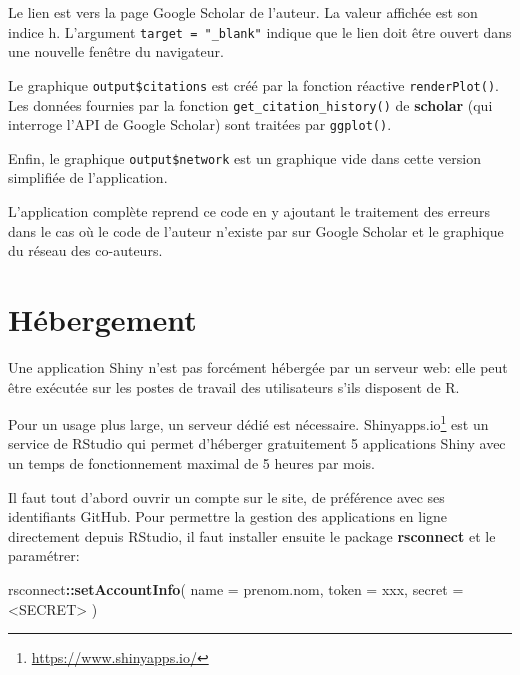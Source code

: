 \documentclass[
  12pt,
  french,
  a4paper,
  extrafontsizes,onecolumn,openright
  ]{memoir}
\newenvironment{Shaded}{\begin{snugshade}}{\end{snugshade}}
\newcommand{\AttributeTok}[1]{\textcolor[rgb]{0.13,0.29,0.53}{#1}}
\newcommand{\FunctionTok}[1]{\textcolor[rgb]{0.13,0.29,0.53}{\textbf{#1}}}
\newcommand{\NormalTok}[1]{#1}
\newcommand{\SpecialCharTok}[1]{\textcolor[rgb]{0.81,0.36,0.00}{\textbf{#1}}}
\newcommand{\StringTok}[1]{\textcolor[rgb]{0.31,0.60,0.02}{#1}}
\begin{document}
\normalsize

Le lien est vers la page Google Scholar de l'auteur.
La valeur affichée est son indice h.
L'argument \texttt{target\ =\ "\_blank"} indique que le lien doit être ouvert dans une nouvelle fenêtre du navigateur.

Le graphique \texttt{output\$citations} est créé par la fonction réactive \texttt{renderPlot()}.
Les données fournies par la fonction \texttt{get\_citation\_history()} de \textbf{scholar} (qui interroge l'API de Google Scholar) sont traitées par \texttt{ggplot()}.

Enfin, le graphique \texttt{output\$network} est un graphique vide dans cette version simplifiée de l'application.

L'application complète reprend ce code en y ajoutant le traitement des erreurs dans le cas où le code de l'auteur n'existe par sur Google Scholar et le graphique du réseau des co-auteurs.

\section{Hébergement}\label{sec:hebergement-shiny}

Une application Shiny n'est pas forcément hébergée par un serveur web: elle peut être exécutée sur les postes de travail des utilisateurs s'ils disposent de R.

Pour un usage plus large, un serveur dédié est nécessaire.
Shinyapps.io\footnote{\url{https://www.shinyapps.io/}} est un service de RStudio qui permet d'héberger gratuitement 5 applications Shiny avec un temps de fonctionnement maximal de 5 heures par mois.

Il faut tout d'abord ouvrir un compte sur le site, de préférence avec ses identifiants GitHub.
Pour permettre la gestion des applications en ligne directement depuis RStudio, il faut installer ensuite le package \textbf{rsconnect} et le paramétrer:

\scriptsize

\begin{Shaded}
\begin{Highlighting}[]
\NormalTok{rsconnect}\SpecialCharTok{::}\FunctionTok{setAccountInfo}\NormalTok{(}
  \AttributeTok{name =} \StringTok{\textquotesingle{}prenom.nom\textquotesingle{}}\NormalTok{,}
    \AttributeTok{token =} \StringTok{\textquotesingle{}xxx\textquotesingle{}}\NormalTok{,}
    \AttributeTok{secret =} \StringTok{\textquotesingle{}\textless{}SECRET\textgreater{}\textquotesingle{}}
\NormalTok{)}
\end{Highlighting}
\end{Shaded}
\end{document}
